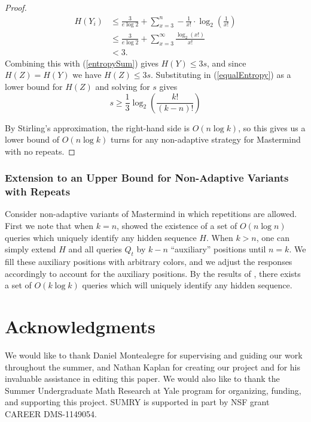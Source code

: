\documentclass[12pt, a4paper]{article}
\begin{document}
\begin{proof}
	\begin{align*}
		H(Y_i) &\leq \frac{3}{e\log 2}+\sum_{x=3}^n-\frac{1}{x!}\cdot\log_2\left(\frac{1}{x!}\right)\\
		&\le \frac{3}{e\log 2}+\sum_{x=3}^\infty \frac{\log_2(x!)}{x!}\\
		&<3.
	\end{align*}
	Combining this with (\ref{entropySum}) gives $H(Y) \leq 3s$, and since $H(Z) = H(Y)$ we have $H(Z) \leq 3s$. Substituting in (\ref{equalEntropy}) as a lower bound for $H(Z)$ and solving for $s$ gives
	\begin{equation*}
	s \geq \frac{1}{3}\log_2\left(\frac{k!}{(k-n)!}\right)
	\end{equation*}
	
	By Stirling's approximation, the right-hand side is $O(n\log k)$, so this gives us a lower bound of $O(n \log k)$ turns for any non-adaptive strategy for Mastermind with no repeats.
\end{proof}
\subsubsection{Extension to an Upper Bound for Non-Adaptive Variants with Repeats}
Consider non-adaptive variants of Mastermind in which repetitions are allowed. First we note that when $k=n$, \cite{DS13} showed the existence of a set of $O(n \log n)$ queries which uniquely identify any hidden sequence $H$. When $k > n$, one can simply extend $H$ and all queries $Q_t$ by $k - n$ ``auxiliary'' positions until $n = k$. We fill these auxiliary positions with arbitrary colors, and we adjust the responses accordingly to account for the auxiliary positions. By the results of \cite{DS13}, there exists a set of $O(k \log k)$ queries which will uniquely identify any hidden sequence.

\section{Acknowledgments}
We would like to thank Daniel Montealegre for supervising and guiding our work throughout the summer, and Nathan Kaplan for creating our project and for his invaluable assistance in editing this paper. 
 We would also like to thank the Summer Undergraduate Math Research at Yale program for organizing, funding, and supporting this project. SUMRY is supported in part by NSF grant CAREER DMS-1149054.
\medskip


\end{document}
